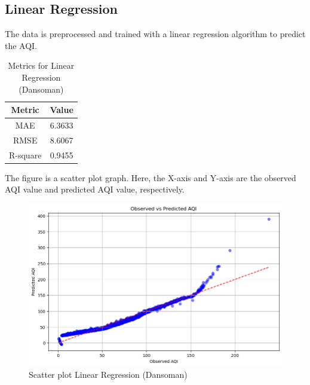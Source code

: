 \documentclass{book}
\numberwithin{equation}{section}
\numberwithin{figure}{section}
\begin{document}
\subsection{Linear Regression}
\vspace{-5mm} %
The data is preprocessed and trained with a linear regression algorithm to predict the AQI.
\vspace{-5mm} %
\begin{table}[H]
    \centering
    \begin{tabular}{|c|c|}
        \hline
        \textbf{Metric} & \textbf{Value} \\
        \hline
        MAE & 6.3633 \\
        \hline
        RMSE & 8.6067 \\
        \hline
        R-square & 0.9455 \\
        \hline
    \end{tabular}
    \caption{Metrics for Linear Regression (Dansoman)}
    \label{tab: Linear metrics(Dansoman)}
\end{table}
The figure is a scatter plot graph. Here, the X-axis and Y-axis are the observed AQI value and predicted AQI value, respectively.
\vspace{-5mm} %
\begin{figure}[H]
    \centering
    \includegraphics[width=\linewidth]{dansoman scatter plot.png}
    \caption{ Scatter plot Linear Regression (Dansoman)}
    \label{fig: Linear scatter plot(Dansoman)}
\end{figure}
\end{document}
